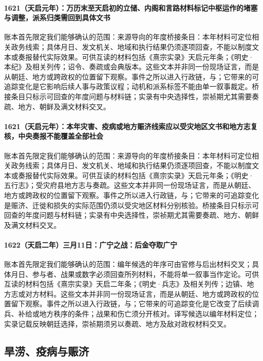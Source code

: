 \paragraph{1621（天启元年）：万历末至天启初的立储、内阁和言路材料标记中枢运作的堵塞与调整，派系归类需回到具体文书} 账本首先限定我们能够确认的范围：来源导向的年度桥接条目：本年材料可定位相关政务线索；具体月日、发文机关、地域和执行结果仍须逐项回查，不能以制度文本或奏报替代实际效果。可供互读的材料包括《熹宗实录》天启元年条；《明史·本纪》及相关列传；诏令、奏疏或会典版本。这些文本并非同一份现场证言，而是从朝廷、地方或跨政权的位置留下观察。事件之所以进入行政链，与；它带来的可追踪变化是它影响后续人事与政策议程；动机和派系标签不能由单一叙事裁定。桥接条目只标示可回查的年度问题与材料链；实录有中央选择性，崇祯期尤其需要奏疏、地方、朝鲜及满文材料交叉。

\paragraph{1621（天启元年）：本年灾害、疫病或地方赈济线索应以受灾地区文书和地方志复核，中央奏报不能覆盖全部社会} 账本首先限定我们能够确认的范围：来源导向的年度桥接条目：本年材料可定位相关政务线索；具体月日、发文机关、地域和执行结果仍须逐项回查，不能以制度文本或奏报替代实际效果。可供互读的材料包括《熹宗实录》天启元年条；《明史·五行志》；受灾府县地方志与奏疏。这些文本并非同一份现场证言，而是从朝廷、地方或跨政权的位置留下观察。事件之所以进入行政链，与；它带来的可追踪变化是赈济、迁徙和损失的实际范围仍须以受灾地区材料分别核验。桥接条目只标示可回查的年度问题与材料链；实录有中央选择性，崇祯期尤其需要奏疏、地方、朝鲜及满文材料交叉。

\paragraph{1622（天启二年）三月11日：广宁之战：后金夺取广宁} 账本首先限定我们能够确认的范围：编年候选的年序可由官修与后出材料交叉；具体月日、参与者、战果或数字必须回查所列材料，不能将单一叙事当作定论。可供互读的材料包括《熹宗实录》天启二年条；《明史·兵志》及相关列传；边镇、地方志或对方材料。这些文本并非同一份现场证言，而是从朝廷、地方或跨政权的位置留下观察。事件之所以进入行政链，与；它带来的可追踪变化是它改变了后续调兵、补给或地方秩序的条件；战果和伤亡须分开核对。译写候选以编年材料定位；实录记载反映朝廷选择，崇祯期须另以奏疏、地方及敌对政权材料交叉。

\subsection{旱涝、疫病与赈济}


